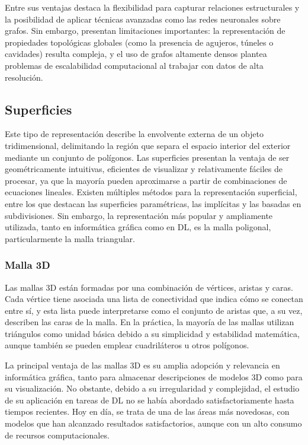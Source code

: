 Entre sus ventajas destaca la flexibilidad para capturar relaciones estructurales y la posibilidad de aplicar técnicas avanzadas como las redes neuronales sobre grafos. Sin embargo, presentan limitaciones importantes: la representación de propiedades topológicas globales (como la presencia de agujeros, túneles o cavidades) resulta compleja, y el uso de grafos altamente densos plantea problemas de escalabilidad computacional al trabajar con datos de alta resolución.

\subsection{Superficies}
Este tipo de representación describe la envolvente externa de un objeto tridimensional, delimitando la región que separa el espacio interior del exterior mediante un conjunto de polígonos. Las superficies presentan la ventaja de ser geométricamente intuitivas, eficientes de visualizar y relativamente fáciles de procesar, ya que la mayoría pueden aproximarse a partir de combinaciones de ecuaciones lineales. Existen múltiples métodos para la representación superficial, entre los que destacan las superficies paramétricas, las implícitas y las basadas en subdivisiones. Sin embargo, la representación más popular y ampliamente utilizada, tanto en informática gráfica como en DL, es la malla poligonal, particularmente la malla triangular.

\subsubsection{Malla 3D}
Las mallas 3D están formadas por una combinación de vértices, aristas y caras. Cada vértice tiene asociada una lista de conectividad que indica cómo se conectan entre sí, y esta lista puede interpretarse como el conjunto de aristas que, a su vez, describen las caras de la malla. En la práctica, la mayoría de las mallas utilizan triángulos como unidad básica debido a su simplicidad y estabilidad matemática, aunque también se pueden emplear cuadriláteros u otros polígonos.

La principal ventaja de las mallas 3D es su amplia adopción y relevancia en informática gráfica, tanto para almacenar descripciones de modelos 3D como para su visualización. No obstante, debido a su irregularidad y complejidad, el estudio de su aplicación en tareas de DL no se había abordado satisfactoriamente hasta tiempos recientes. Hoy en día, se trata de una de las áreas más novedosas, con modelos que han alcanzado resultados satisfactorios, aunque con un alto consumo de recursos computacionales.


